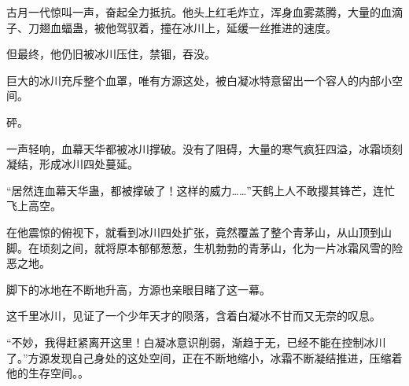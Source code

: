 \begin{this_body}
古月一代惊叫一声，奋起全力抵抗。他头上红毛炸立，浑身血雾蒸腾，大量的血滴子、刀翅血蝠蛊，被他驾驭着，撞在冰川上，延缓一丝推进的速度。

但最终，他仍旧被冰川压住，禁锢，吞没。

巨大的冰川充斥整个血罩，唯有方源这处，被白凝冰特意留出一个容人的内部小空间。

砰。

一声轻响，血幕天华都被冰川撑破。没有了阻碍，大量的寒气疯狂四溢，冰霜顷刻凝结，形成冰川四处蔓延。

“居然连血幕天华蛊，都被撑破了！这样的威力……”天鹤上人不敢撄其锋芒，连忙飞上高空。

在他震惊的俯视下，就看到冰川四处扩张，竟然覆盖了整个青茅山，从山顶到山脚。在顷刻之间，就将原本郁郁葱葱，生机勃勃的青茅山，化为一片冰霜风雪的险恶之地。

脚下的冰地在不断地升高，方源也亲眼目睹了这一幕。

这千里冰川，见证了一个少年天才的陨落，含着白凝冰不甘而又无奈的叹息。

“不妙，我得赶紧离开这里！白凝冰意识削弱，渐趋于无，已经不能在控制冰川了。”方源发现自己身处的这处空间，正在不断地缩小，冰霜不断凝结推进，压缩着他的生存空间。。

\end{this_body}

